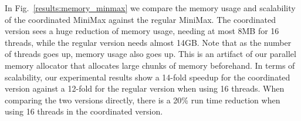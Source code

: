 In Fig.~\ref{results:memory_minmax} we compare the memory usage and scalability
of the coordinated MiniMax against the regular MiniMax. The coordinated version
sees a huge reduction of memory usage, needing at most 8MB for 16 threads, while
the regular version needs almost 14GB. Note that as the number of threads goes
up, memory usage also goes up. This is an artifact of our parallel memory
allocator that allocates large chunks of memory beforehand.
In terms of scalability, our experimental results show a 14-fold speedup for the
coordinated version against a 12-fold for the regular version when using 16
threads. When comparing the two versions directly, there is a 20\% run time
reduction when using 16 threads in the coordinated version.

